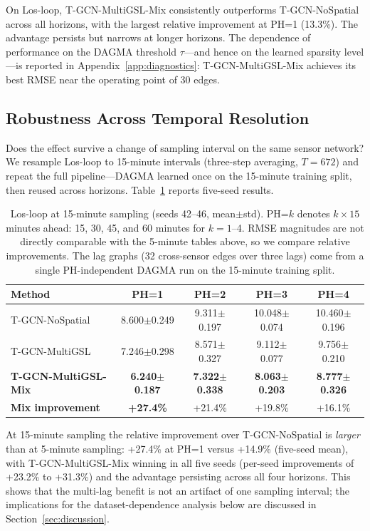 On Los-loop, T-GCN-MultiGSL-Mix consistently outperforms T-GCN-NoSpatial across all horizons, with the largest relative improvement at PH=1 (13.3\%). The advantage persists but narrows at longer horizons. The dependence of performance on the DAGMA threshold $\tau$---and hence on the learned sparsity level---is reported in Appendix~\ref{app:diagnostics}: T-GCN-MultiGSL-Mix achieves its best RMSE near the operating point of 30 edges.

\subsection{Robustness Across Temporal Resolution}\label{sec:los15min}

Does the effect survive a change of sampling interval on the same sensor network? We resample Los-loop to 15-minute intervals (three-step averaging, $T=672$) and repeat the full pipeline---DAGMA learned once on the 15-minute training split, then reused across horizons. Table~\ref{tab:los15min} reports five-seed results.

\begin{table}[t]
\centering
\caption{Los-loop at 15-minute sampling (seeds 42--46, mean$\pm$std). PH=$k$ denotes $k\times15$ minutes ahead: 15, 30, 45, and 60 minutes for $k=1$--4. RMSE magnitudes are not directly comparable with the 5-minute tables above, so we compare relative improvements. The lag graphs (32 cross-sensor edges over three lags) come from a single PH-independent DAGMA run on the 15-minute training split.}
\label{tab:los15min}
\small
\setlength{\tabcolsep}{4pt}
\begin{tabular}{lcccc}
\toprule
\textbf{Method} & \textbf{PH=1} & \textbf{PH=2} & \textbf{PH=3} & \textbf{PH=4} \\
\midrule
T-GCN-NoSpatial & 8.600$\pm$0.249 & 9.311$\pm$0.197 & 10.048$\pm$0.074 & 10.460$\pm$0.196 \\
T-GCN-MultiGSL & 7.246$\pm$0.298 & 8.571$\pm$0.327 & 9.112$\pm$0.077 & 9.756$\pm$0.210 \\
\textbf{T-GCN-MultiGSL-Mix} & \textbf{6.240$\pm$0.187} & \textbf{7.322$\pm$0.338} & \textbf{8.063$\pm$0.203} & \textbf{8.777$\pm$0.326} \\
\midrule
\textbf{Mix improvement} & \textbf{+27.4\%} & +21.4\% & +19.8\% & +16.1\% \\
\bottomrule
\end{tabular}
\end{table}

At 15-minute sampling the relative improvement over T-GCN-NoSpatial is \emph{larger} than at 5-minute sampling: +27.4\% at PH=1 versus +14.9\% (five-seed mean), with T-GCN-MultiGSL-Mix winning in all five seeds (per-seed improvements of +23.2\% to +31.3\%) and the advantage persisting across all four horizons. This shows that the multi-lag benefit is not an artifact of one sampling interval; the implications for the dataset-dependence analysis below are discussed in Section~\ref{sec:discussion}.


